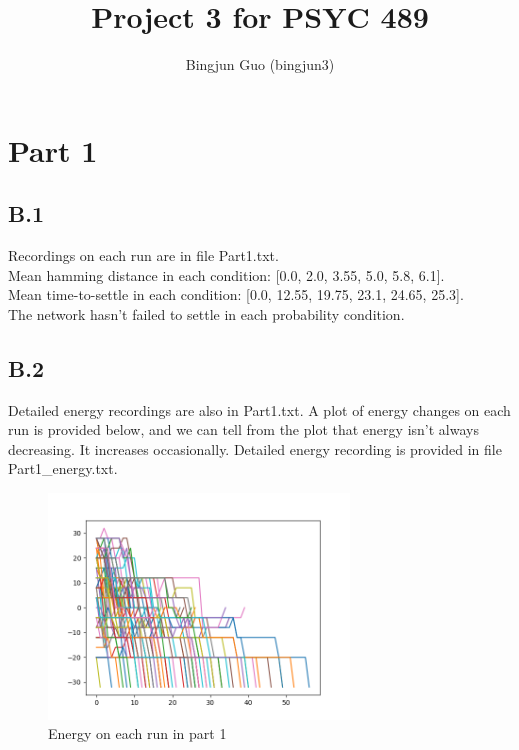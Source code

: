 \documentclass{article}
\title{Project 3 for PSYC 489}
\author{Bingjun Guo (bingjun3)}
\begin{document}
\maketitle
\section*{Part 1}
\subsection*{B.1}
Recordings on each run are in file Part1.txt.\\
Mean hamming distance in each condition: [0.0, 2.0, 3.55, 5.0, 5.8, 6.1].\\
Mean time-to-settle in each condition: [0.0, 12.55, 19.75, 23.1, 24.65, 25.3].\\
The network hasn't failed to settle in each probability condition.
\subsection*{B.2}
Detailed energy recordings are also in Part1.txt. A plot of energy changes on each run is provided below, and we can tell from the plot that energy isn't always decreasing. It increases occasionally. Detailed energy recording is provided in file Part1\_energy.txt.
\begin{figure}[h]
    \centering
    \includegraphics[width=8cm]{Part1energy}
    \caption{Energy on each run in part 1}
\end{figure}
\newpage
\end{document}
